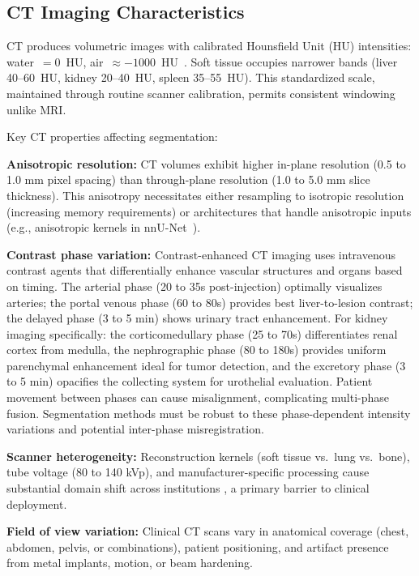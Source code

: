 \documentclass[conference]{IEEEtran}
\begin{document}
\subsection{CT Imaging Characteristics}

CT produces volumetric images with calibrated Hounsfield Unit (HU) intensities: water~$=0$~HU, air~$\approx$$-1000$~HU~\cite{litjens2017survey}. Soft tissue occupies narrower bands (liver 40--60~HU, kidney 20--40~HU, spleen 35--55~HU). This standardized scale, maintained through routine scanner calibration, permits consistent windowing unlike MRI.

Key CT properties affecting segmentation:

\textbf{Anisotropic resolution:} CT volumes exhibit higher in-plane resolution (0.5 to 1.0 mm pixel spacing) than through-plane resolution (1.0 to 5.0 mm slice thickness). This anisotropy necessitates either resampling to isotropic resolution (increasing memory requirements) or architectures that handle anisotropic inputs (e.g., anisotropic kernels in nnU-Net~\cite{isensee2021nnunet}).

\textbf{Contrast phase variation:} Contrast-enhanced CT imaging uses intravenous contrast agents that differentially enhance vascular structures and organs based on timing. The arterial phase (20 to 35s post-injection) optimally visualizes arteries; the portal venous phase (60 to 80s) provides best liver-to-lesion contrast; the delayed phase (3 to 5 min) shows urinary tract enhancement. For kidney imaging specifically: the corticomedullary phase (25 to 70s) differentiates renal cortex from medulla, the nephrographic phase (80 to 180s) provides uniform parenchymal enhancement ideal for tumor detection, and the excretory phase (3 to 5 min) opacifies the collecting system for urothelial evaluation. Patient movement between phases can cause misalignment, complicating multi-phase fusion. Segmentation methods must be robust to these phase-dependent intensity variations and potential inter-phase misregistration.

\textbf{Scanner heterogeneity:} Reconstruction kernels (soft tissue vs.\ lung vs.\ bone), tube voltage (80 to 140 kVp), and manufacturer-specific processing cause substantial domain shift across institutions \cite{tajbakhsh2020embracing}, a primary barrier to clinical deployment.

\textbf{Field of view variation:} Clinical CT scans vary in anatomical coverage (chest, abdomen, pelvis, or combinations), patient positioning, and artifact presence from metal implants, motion, or beam hardening.
\end{document}
